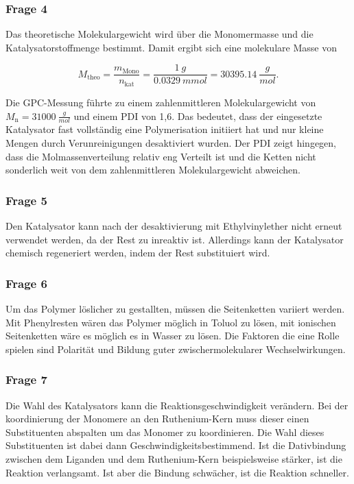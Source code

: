 \documentclass[10pt,a4paper,ngerman]{scrartcl}
\begin{document}
		\subsubsection{Frage 4}

			Das theoretische Molekulargewicht wird über die Monomermasse und die Katalysatorstoffmenge bestimmt. Damit ergibt sich eine molekulare Masse von

			\begin{equation*}
				M_\text{theo} = \frac{m_\text{Mono}}{n_\text{kat}} = \frac{\SI{1}{g}}{\SI{0,0329}{mmol}} = \SI{30395,14}{\frac{g}{mol}} \text{.}
			\end{equation*}

			Die GPC-Messung führte zu einem zahlenmittleren Molekulargewicht von $M_\text{n} = \SI{31000}{\frac{g}{mol}}$ und einem PDI von 1,6. 
			Das bedeutet, dass der eingesetzte Katalysator fast vollständig eine Polymerisation initiiert hat und nur kleine Mengen durch 
			Verunreinigungen desaktiviert wurden. Der PDI zeigt hingegen, dass die Molmassenverteilung relativ eng Verteilt ist und die Ketten nicht 
			sonderlich weit von dem zahlenmittleren Molekulargewicht abweichen.

		\subsubsection{Frage 5}

			Den Katalysator kann nach der desaktivierung mit Ethylvinylether nicht erneut verwendet werden, da der Rest zu inreaktiv ist. Allerdings kann der Katalysator 
			chemisch regeneriert werden, indem der Rest substituiert wird. 

		\subsubsection{Frage 6}

			Um das Polymer löslicher zu gestallten, müssen die Seitenketten variiert werden. Mit Phenylresten wären das Polymer möglich in Toluol zu lösen, mit ionischen 
			Seitenketten wäre es möglich es in Wasser zu lösen. Die Faktoren die eine Rolle spielen sind Polarität und Bildung guter zwischermolekularer Wechselwirkungen.

		\subsubsection{Frage 7}

			Die Wahl des Katalysators kann die Reaktionsgeschwindigkeit verändern. Bei der koordinierung der Monomere an den Ruthenium-Kern muss dieser einen Substituenten 
			abspalten um das Monomer zu koordinieren. Die Wahl dieses Substituenten ist dabei dann Geschwindigkeitsbestimmend. Ist die Dativbindung zwischen dem Liganden und 
			dem Ruthenium-Kern beispielsweise stärker, ist die Reaktion verlangsamt. Ist aber die Bindung schwächer, ist die Reaktion schneller.
		
\end{document}
